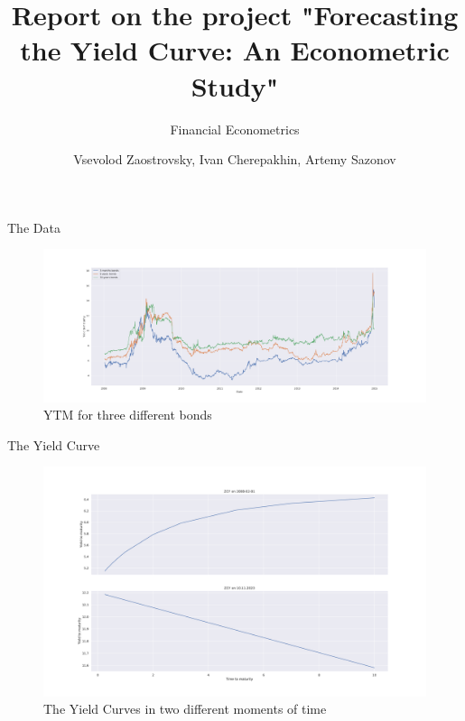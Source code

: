 \documentclass[aspectratio=169]{beamer}
\title{Report on the project "Forecasting the Yield Curve: An Econometric Study"}
\subtitle{Financial Econometrics}
\author{Vsevolod Zaostrovsky, Ivan Cherepakhin, Artemy Sazonov}
\institute{Vega Institute Foundation}
\begin{document}
\maketitle

\begin{frame}{The Data}
    \begin{figure}
    \includegraphics[scale=0.21]{fig/YTMp.pdf}

    \caption{YTM for three different bonds}
    \label{fig:YTMp}
    \end{figure}
\end{frame}

    \begin{frame}{The Yield Curve}
        \begin{figure}
        \includegraphics[scale=0.21]{fig/ZCYp.pdf}
        \caption{The Yield Curves in two different moments of time}
        \label{fig:ZCY}
        \end{figure}
    \end{frame}
\end{document}
